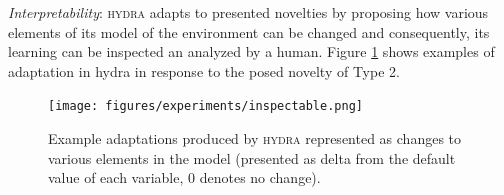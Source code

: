 \documentclass{article}
\begin{document}
\emph{Interpretability}: \textsc{hydra} adapts to presented novelties by proposing how various elements of its model of the environment can be changed and consequently, its learning can be inspected an analyzed by a human. Figure \ref{fig:example} shows examples of adaptation in hydra in response to the posed novelty of Type 2. 

\begin{figure}
    \centering
    \texttt{[image: figures/experiments/inspectable.png]}
    \caption{Example adaptations produced by \textsc{hydra} represented as changes to various elements in the model (presented as delta from the default value of each variable, 0 denotes no change).}
    \label{fig:example}
\end{figure}










\end{document}
